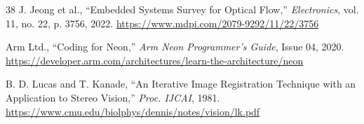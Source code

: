 \documentclass[conference]{IEEEtran}
\begin{document}
\begin{thebibliography}{38}
J. Jeong et al., ``Embedded Systems Survey for Optical Flow,'' \textit{Electronics}, vol. 11, no. 22, p. 3756, 2022. \url{https://www.mdpi.com/2079-9292/11/22/3756}

Arm Ltd., ``Coding for Neon,'' \textit{Arm Neon Programmer's Guide}, Issue 04, 2020. \url{https://developer.arm.com/architectures/learn-the-architecture/neon}

B. D. Lucas and T. Kanade, ``An Iterative Image Registration Technique with an Application to Stereo Vision,'' \textit{Proc. IJCAI}, 1981. \url{https://www.cmu.edu/biolphys/dennis/notes/vision/lk.pdf}

\end{thebibliography}
\end{document}
